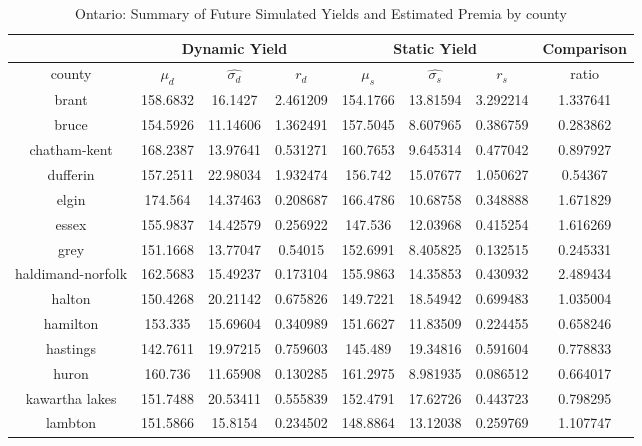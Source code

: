 \begin{table}[H]\centering
\caption{Ontario: Summary of Future Simulated Yields and Estimated Premia by county}
\label{my-label}
\begin{tabular}{|c|ccc|ccc|c|}

\hline
\multicolumn{1}{|c}{} & \multicolumn{3}{|c}{Dynamic Yield} & \multicolumn{3}{|c}{Static Yield} & \multicolumn{1}{|c|}{Comparison}\\ 
\hline
county        & $\mu_d$ & $\hat{\sigma_d}$ & $r_d$ & $\mu_s$ & $\hat{\sigma_s}$ & $r_s$ & ratio \\
\hline


brant                     & 158.6832 & 16.1427  & 2.461209 & 154.1766 & 13.81594 & 3.292214 & 1.337641 \\
bruce                     & 154.5926 & 11.14606 & 1.362491 & 157.5045 & 8.607965 & 0.386759 & 0.283862 \\
chatham-kent              & 168.2387 & 13.97641 & 0.531271 & 160.7653 & 9.645314 & 0.477042 & 0.897927 \\
dufferin                  & 157.2511 & 22.98034 & 1.932474 & 156.742  & 15.07677 & 1.050627 & 0.54367  \\
elgin                     & 174.564  & 14.37463 & 0.208687 & 166.4786 & 10.68758 & 0.348888 & 1.671829 \\
essex                     & 155.9837 & 14.42579 & 0.256922 & 147.536  & 12.03968 & 0.415254 & 1.616269 \\
grey                      & 151.1668 & 13.77047 & 0.54015  & 152.6991 & 8.405825 & 0.132515 & 0.245331 \\
haldimand-norfolk         & 162.5683 & 15.49237 & 0.173104 & 155.9863 & 14.35853 & 0.430932 & 2.489434 \\
halton                    & 150.4268 & 20.21142 & 0.675826 & 149.7221 & 18.54942 & 0.699483 & 1.035004 \\
hamilton                  & 153.335  & 15.69604 & 0.340989 & 151.6627 & 11.83509 & 0.224455 & 0.658246 \\
hastings                  & 142.7611 & 19.97215 & 0.759603 & 145.489  & 19.34816 & 0.591604 & 0.778833 \\
huron                     & 160.736  & 11.65908 & 0.130285 & 161.2975 & 8.981935 & 0.086512 & 0.664017 \\
kawartha lakes            & 151.7488 & 20.53411 & 0.555839 & 152.4791 & 17.62726 & 0.443723 & 0.798295 \\
lambton                   & 151.5866 & 15.8154  & 0.234502 & 148.8864 & 13.12038 & 0.259769 & 1.107747 \\

\end{tabular}
\end{table}

